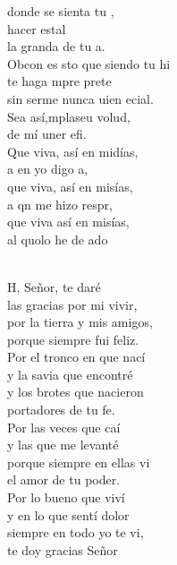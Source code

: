 \documentclass[12pt]{article}
\begin{document}
\begin{multicols*}{2}
\begin{cancion}
	donde  se sienta tu ,\\
	hacer estal\\
	la granda de tu a.\\
	Obcon es sto que siendo tu hi\\
	te haga mpre prete\\
	sin serme nunca uien ecial.\\
	Sea así,mplaseu volud, \\
	 de mí uner efi.\\
	Que viva, así en midías,\\
	a en yo digo a,\\
	que viva, así en misías,\\
	a qn me hizo respr,\\
	que viva así en misías,\\
	al quolo he de ado\\
	       \\
\end{cancion}%

\begin{cancion}%
	H, Señor, te daré \\
las gracias por mi vivir,\\
por la tierra y mis amigos, \\
porque siempre fui feliz.\\
Por el tronco en que nací \\
y la savia que encontré\\
y los brotes que nacieron \\
portadores de tu fe.\\
Por las veces que caí \\
y las que me levanté\\
porque siempre en ellas vi \\
el amor de tu poder.\\
Por lo bueno que viví \\
y en lo que sentí dolor\\
siempre en todo yo te vi, \\
te doy gracias Señor\\
\end{cancion}%


\end{multicols*}
\end{document}
